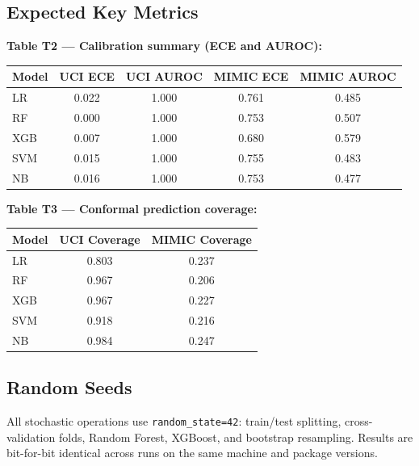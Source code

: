 \documentclass[11pt]{article}
\begin{document}
\subsection*{Expected Key Metrics}

\textbf{Table T2 — Calibration summary (ECE and AUROC):}

\begin{center}
\begin{tabular}{lcccc}
\toprule
Model & UCI ECE & UCI AUROC & MIMIC ECE & MIMIC AUROC \\
\midrule
LR  & 0.022 & 1.000 & 0.761 & 0.485 \\
RF  & 0.000 & 1.000 & 0.753 & 0.507 \\
XGB & 0.007 & 1.000 & 0.680 & 0.579 \\
SVM & 0.015 & 1.000 & 0.755 & 0.483 \\
NB  & 0.016 & 1.000 & 0.753 & 0.477 \\
\bottomrule
\end{tabular}
\end{center}

\textbf{Table T3 — Conformal prediction coverage:}

\begin{center}
\begin{tabular}{lcc}
\toprule
Model & UCI Coverage & MIMIC Coverage \\
\midrule
LR  & 0.803 & 0.237 \\
RF  & 0.967 & 0.206 \\
XGB & 0.967 & 0.227 \\
SVM & 0.918 & 0.216 \\
NB  & 0.984 & 0.247 \\
\bottomrule
\end{tabular}
\end{center}

\subsection*{Random Seeds}

All stochastic operations use \texttt{random\_state=42}: train/test
splitting, cross-validation folds, Random Forest, XGBoost, and bootstrap
resampling. Results are bit-for-bit identical across runs on the same
machine and package versions.
\end{document}
